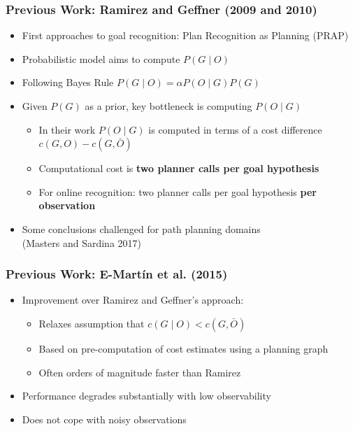 \documentclass{beamer}
\begin{document}
	\begin{frame}[c]\frametitle{Previous Work: Ramirez and Geffner (2009 and 2010)}
		\begin{itemize}
			\item First approaches to goal recognition: Plan Recognition as Planning (PRAP)
			\item Probabilistic model aims to compute $P(G \mid O)$
			\item Following Bayes Rule $P(G \mid O) = \alpha P(O \mid G) P(G)$
			\item Given $P(G)$ as a prior, key bottleneck is computing $P(O \mid G)$
			\begin{itemize}
				\item In their work $P(O \mid G)$ is computed in terms of a cost difference $c(G,O) - c(G,\bar{O})$
				\item Computational cost is \textbf{two planner calls per goal hypothesis}
				\item For online recognition: two planner calls per goal hypothesis \textbf{per observation}
			\end{itemize}
			\item Some conclusions challenged for path planning domains\\ (Masters and Sardina 2017)
		\end{itemize}
	\end{frame}
	\begin{frame}[c]\frametitle{Previous Work: E-Martín et al. (2015)}
		\begin{itemize}
			\item Improvement over Ramirez and Geffner's approach:
			\begin{itemize}
				\item Relaxes assumption that $c(G \mid O) < c(G,\bar{O})$
				\item Based on pre-computation of cost estimates using a planning graph
				\item Often orders of magnitude faster than Ramirez
			\end{itemize}
			\item Performance degrades substantially with low observability
			\item Does not cope with noisy observations
		\end{itemize}
	\end{frame}
\end{document}
